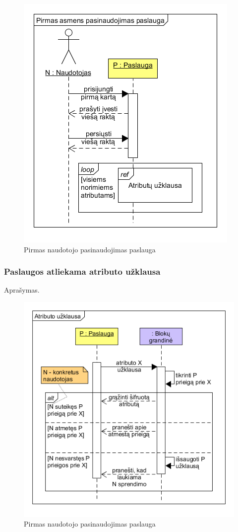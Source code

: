 \begin{figure}[H]
    \centering
    \includegraphics[scale=0.8]{img/initiateUserServiceRelationship}
    \caption{Pirmas naudotojo pasinaudojimas paslauga}
    \label{fig:initiateUserServiceRelations}
\end{figure}

\subsubsection{Paslaugos atliekama atributo užklausa}

Aprašymas.

\begin{figure}[H]
    \centering
    \includegraphics[scale=0.8]{img/askForAttributeSequence}
    \caption{Pirmas naudotojo pasinaudojimas paslauga}
    \label{fig:askForAttributeSequence}
\end{figure}

